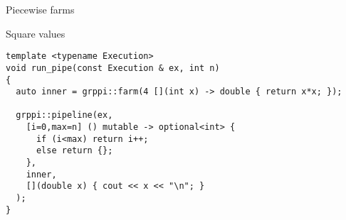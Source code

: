\begin{frame}[t,fragile]{Piecewise farms}
\begin{block}{Square values}
\begin{lstlisting}
template <typename Execution>
void run_pipe(const Execution & ex, int n)
{
  auto inner = grppi::farm(4 [](int x) -> double { return x*x; });

  grppi::pipeline(ex,
    [i=0,max=n] () mutable -> optional<int> {
      if (i<max) return i++;
      else return {};
    },
    inner,
    [](double x) { cout << x << "\n"; }
  );
}
\end{lstlisting}
\end{block}
\end{frame}
